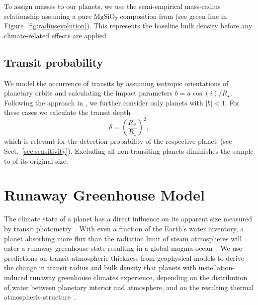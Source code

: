 \documentclass[twocolumn,twocolappendix,linenumbers]{aastex631}
\begin{document}
To assign masses to our planets, we use the semi-empirical mass-radius relationship assuming a pure $\mathrm{MgSiO_3}$ composition from \citet{Zeng2016} (see green line in Figure~\ref{fig:radiusevolution}).
This represents the baseline bulk density before any climate-related effects are applied.


\subsection{Transit probability}
We model the occurrence of transits by assuming isotropic orientations of planetary orbits and calculating the impact parameters $b = a \cos(i)/R_\star$.
Following the approach in \citet{Bixel2021}, we further consider only planets with $|b| < 1$.
For these cases we calculate the transit depth
\begin{equation}\label{eq:transitdepth}
    \delta = \left( \frac{R_\mathrm{P}}{R_\star} \right)^2,
\end{equation}
which is relevant for the detection probability of the respective planet~(see Sect.~\ref{sec:sensitivity}).
Excluding all non-transiting planets diminishes the sample to  of its original size.


\section{Runaway Greenhouse Model}\label{sec:met_rghmodel}
The climate state of a planet has a direct influence on its apparent size measured by transit photometry~\citep{Turbet2019,Turbet2020,Mousis2020,2021ApJ...914...84A}.
With even a fraction of the Earth's water inventory, a planet absorbing more flux than the radiation limit of steam atmospheres will enter a runaway greenhouse state resulting in a global magma ocean~\citep{Lichtenberg2021c,Boukrouche2021}.
We use predictions on transit atmospheric thickness from geophysical models to derive the change in transit radius and bulk density that planets with instellation-induced runaway greenhouse climates experience, depending on the distribution of water between planetary interior and atmosphere, and on the resulting thermal atmospheric structure~\citep{Dorn2021,Salvador2023}.
\end{document}
